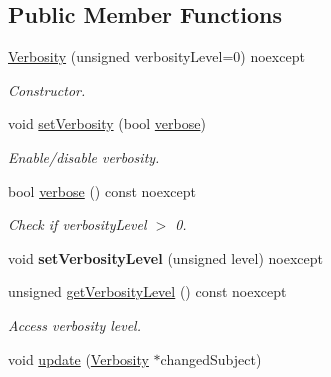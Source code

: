 \subsection*{\-Public \-Member \-Functions}
\begin{DoxyCompactItemize}
\item 
\hyperlink{classSpacy_1_1Mixin_1_1Verbosity_aefe2f237b0456c4bced001fbfa75f92e}{\-Verbosity} (unsigned verbosity\-Level=0) noexcept
\begin{DoxyCompactList}\small\item\em \-Constructor. \end{DoxyCompactList}\item 
void \hyperlink{classSpacy_1_1Mixin_1_1Verbosity_a0365d293ab27e27da9496c668020aefb}{set\-Verbosity} (bool \hyperlink{classSpacy_1_1Mixin_1_1Verbosity_ad367a7328578546938fd2a7e52ab3793}{verbose})
\begin{DoxyCompactList}\small\item\em \-Enable/disable verbosity. \end{DoxyCompactList}\item 
\hypertarget{classSpacy_1_1Mixin_1_1Verbosity_ad367a7328578546938fd2a7e52ab3793}{bool \hyperlink{classSpacy_1_1Mixin_1_1Verbosity_ad367a7328578546938fd2a7e52ab3793}{verbose} () const noexcept}\label{classSpacy_1_1Mixin_1_1Verbosity_ad367a7328578546938fd2a7e52ab3793}

\begin{DoxyCompactList}\small\item\em \-Check if verbosity\-Level $>$ 0. \end{DoxyCompactList}\item 
\hypertarget{classSpacy_1_1Mixin_1_1Verbosity_af84a4b3c933f252a5840ab63d4a38325}{void {\bfseries set\-Verbosity\-Level} (unsigned level) noexcept}\label{classSpacy_1_1Mixin_1_1Verbosity_af84a4b3c933f252a5840ab63d4a38325}

\item 
\hypertarget{classSpacy_1_1Mixin_1_1Verbosity_ae55b7493c53b3bb4c2770c99addb5ee1}{unsigned \hyperlink{classSpacy_1_1Mixin_1_1Verbosity_ae55b7493c53b3bb4c2770c99addb5ee1}{get\-Verbosity\-Level} () const noexcept}\label{classSpacy_1_1Mixin_1_1Verbosity_ae55b7493c53b3bb4c2770c99addb5ee1}

\begin{DoxyCompactList}\small\item\em \-Access verbosity level. \end{DoxyCompactList}\item 
\hypertarget{classSpacy_1_1Mixin_1_1Verbosity_a8cff860c587fcda2cdc86ba744302b33}{void \hyperlink{classSpacy_1_1Mixin_1_1Verbosity_a8cff860c587fcda2cdc86ba744302b33}{update} (\hyperlink{classSpacy_1_1Mixin_1_1Verbosity}{\-Verbosity} $\ast$changed\-Subject)}\label{classSpacy_1_1Mixin_1_1Verbosity_a8cff860c587fcda2cdc86ba744302b33}


\end{DoxyCompactItemize}
